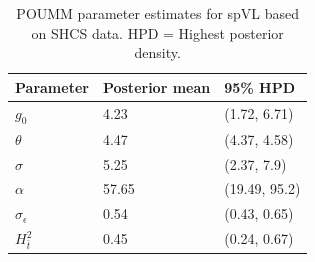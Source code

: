 \documentclass[11pt]{article}
\begin{document}
\begin{table}[H]
\caption{POUMM parameter estimates for spVL based on SHCS data. HPD = Highest posterior density.}
	\begin{tabularx}{\linewidth}{XXX} \hline 
	Parameter & Posterior mean & 95\% HPD \\ \hline 
	${g_{0}}$ & 4.23 & (1.72, 6.71) \\
	$\theta$ & 4.47 & (4.37, 4.58) \\
	$\sigma$ & 5.25 & (2.37, 7.9) \\
	$\alpha$ & 57.65 & (19.49, 95.2) \\
	$\sigma_\epsilon$ & 0.54 & (0.43, 0.65) \\ 
	$H^2_{\bar{t}}$ & 0.45 & (0.24, 0.67) \\ \hline
	\end{tabularx}
	\label{tab:POUMM-parameters-our-estimates}
\end{table}
\end{document}
